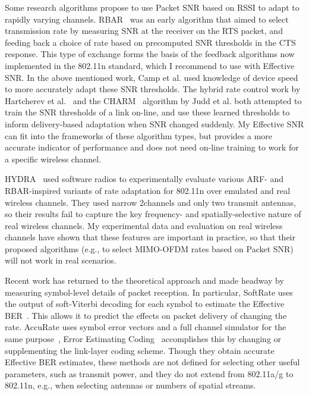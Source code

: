 Some research algorithms propose to use Packet SNR based on RSSI to adapt to rapidly varying channels. RBAR~\cite{Holland_RBAR} was an early algorithm that aimed to select transmission rate by measuring SNR at the receiver on the RTS packet, and feeding back a choice of rate based on precomputed SNR thresholds in the CTS response. This type of exchange forms the basis of the feedback algorithms now implemented in the 802.11n standard, which I recommend to use with Effective SNR. In the above mentioned work, Camp et al. used knowledge of device speed to more accurately adapt these SNR thresholds. The hybrid rate control work by Hartcherev et al.~\cite{Haratcherev_Hybrid} and the CHARM~\cite{Judd_CHARM} algorithm by Judd et al. both attempted to train the SNR thresholds of a link on-line, and use these learned thresholds to inform delivery-based adaptation when SNR changed suddenly. My Effective SNR can fit into the frameworks of these algorithm types, but provides a more accurate indicator of performance and does not need on-line training to work for a specific wireless channel.

HYDRA~\cite{Kim_Hydra} used software radios to experimentally evaluate various ARF- and RBAR-inspired variants of rate adaptation for 802.11n over emulated and real wireless channels. They used narrow 2\MHz channels and only two transmit antennas, so their results fail to capture the key frequency- and spatially-selective nature of real wireless channels. My experimental data and evaluation on real wireless channels have shown that these features are important in practice, so that their proposed algorithms (e.g., to select MIMO-OFDM rates based on Packet SNR) will not work in real scenarios. 

Recent work has returned to the theoretical approach and made headway by measuring symbol-level details of packet reception. In particular, SoftRate uses the output of soft-Viterbi decoding for each symbol to estimate the Effective BER~\cite{Vutukuru_SoftRate}. This allows it to predict the effects on packet delivery of changing the rate. AccuRate uses symbol error vectors and a full channel simulator for the same purpose~\cite{Sen_AccuRate}, Error Estimating Coding~\cite{Chen_EEC} accomplishes this by changing or supplementing the link-layer coding scheme. Though they obtain accurate Effective BER estimates, these methods are not defined for selecting other useful parameters, such as transmit power, and they do not extend from 802.11a/g to 802.11n, e.g., when selecting antennas or numbers of spatial streams.

